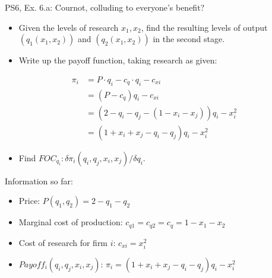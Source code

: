 \begin{frame}{PS6, Ex. 6.a: Cournot, colluding to everyone's benefit?}
    \begin{itemize}
    \item[(a)] Given the levels of research $x_1,x_2$, find the resulting levels of output $(q_1(x_1, x_2))$ and $(q_2(x_1, x_2))$ in the second stage.
    \end{itemize}
  \begin{multicols}{2}
    \begin{itemize}
      \item[(Step 1)] Write up the payoff function, taking research as given:
    \end{itemize}
    \begin{align*}
      \pi_i &= P\cdot q_i - c_q\cdot q_i - c_{xi}\\
            &= (P-c_q) q_i - c_{xi}\\
            &= (2-q_i-q_j-(1-x_i-x_j))q_i-x_i^2\\
            &= (1+x_i+x_j-q_i-q_j)q_i-x_i^2
    \end{align*}
    \begin{itemize}
      \item[(Step 2)] Find $FOC_{q_i}:\delta\pi_i(q_i,q_j,x_i,x_j)/\delta q_i$.
    \end{itemize}
    \vfill\null \columnbreak
    Information so far:
    \begin{itemize}
      \item[1] Price: $P(q_1,q_2)=2-q_1-q_2$
      \item[2] Marginal cost of production: $c_{q1} = c_{q2} = c_q =1 - x_1 - x_2$
      \item[3] Cost of research for firm $i$: $c_{xi}=x_i^2$
      \item[4] $Payoff_i(q_i,q_j,x_i,x_j)$: $\pi_i=(1+x_i+x_j-q_i-q_j)q_i-x_i^2$
    \end{itemize}
    \vfill\null
  \end{multicols}
\end{frame}
